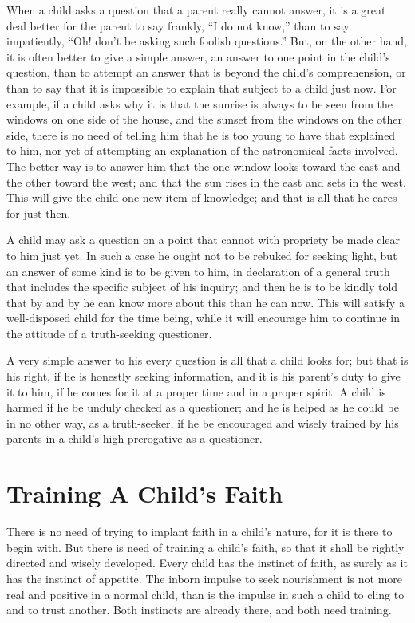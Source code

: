 \documentclass[
]{book}
\begin{document}
When a child asks a question that a parent really cannot answer, it is a great deal better for the parent to say frankly, ``I do not know,'' than to say impatiently, ``Oh! don't be asking such foolish questions.'' But, on the other hand, it is often better to give a simple answer, an answer to one point in the child's question, than to attempt an answer that is beyond the child's comprehension, or than to say that it is impossible to explain that subject to a child just now. For example, if a child asks why it is that the sunrise is always to be seen from the windows on one side of the house, and the sunset from the windows on the other side, there is no need of telling him that he is too young to have that explained to him, nor yet of attempting an explanation of the astronomical facts involved. The better way is to answer him that the one window looks toward the east and the other toward the west; and that the sun rises in the east and sets in the west. This will give the child one new item of knowledge; and that is all that he cares for just then.

A child may ask a question on a point that cannot with propriety be made clear to him just yet. In such a case he ought not to be rebuked for seeking light, but an answer of some kind is to be given to him, in declaration of a general truth that includes the specific subject of his inquiry; and then he is to be kindly told that by and by he can know more about this than he can now. This will satisfy a well-disposed child for the time being, while it will encourage him to continue in the attitude of a truth-seeking questioner.

A very simple answer to his every question is all that a child looks for; but that is his right, if he is honestly seeking information, and it is his parent's duty to give it to him, if he comes for it at a proper time and in a proper spirit. A child is harmed if he be unduly checked as a questioner; and he is helped as he could be in no other way, as a truth-seeker, if he be encouraged and wisely trained by his parents in a child's high prerogative as a questioner.

\hypertarget{training-a-childs-faith}{%
\chapter{Training A Child's Faith}\label{training-a-childs-faith}}

There is no need of trying to implant faith in a child's nature, for it is there to begin with. But there is need of training a child's faith, so that it shall be rightly directed and wisely developed. Every child has the instinct of faith, as surely as it has the instinct of appetite. The inborn impulse to seek nourishment is not more real and positive in a normal child, than is the impulse in such a child to cling to and to trust another. Both instincts are already there, and both need training.
\end{document}
